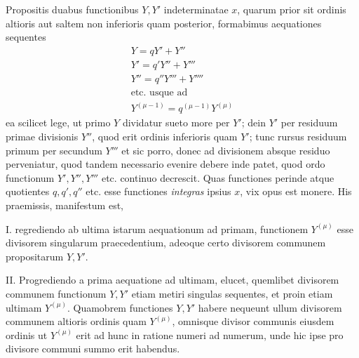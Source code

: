 Propositis duabus functionibus $Y,Y'$ indeterminatae $x$, quarum prior sit ordinis altioris aut saltem non inferioris quam posterior, formabimus aequationes sequentes
\[
\begin{gathered} Y=qY'+Y''\\ Y'=q'Y''+Y'''\\ Y''=q''Y'''+Y''''\\ \text{etc. usque ad}\\ Y^{(\mu-1)}=q^{(\mu-1)}Y^{(\mu)}
\end{gathered}
\] ea scilicet lege, ut primo $Y$ dividatur sueto more per $Y'$; dein $Y'$ per residuum primae divisionis $Y''$, quod erit ordinis inferioris quam $Y'$; tunc rursus residuum primum per secundum $Y'''$ et sic porro, donec ad divisionem absque residuo perveniatur, quod tandem necessario evenire debere inde patet, quod ordo functionum $Y',Y'',Y'''$ etc. continuo decrescit. Quas functiones perinde atque quotientes $q,q',q''$ etc. esse functiones \textit{integras} ipsius $x$, vix opus est monere. His praemissis, manifestum est,

I. regrediendo ab ultima istarum aequationum ad primam, functionem $Y^{(\mu)}$ esse divisorem singularum praecedentium, adeoque certo divisorem communem propositarum $Y,Y'$.

II. Progrediendo a prima aequatione ad ultimam, elucet, quemlibet divisorem communem functionum $Y,Y'$ etiam metiri singulas sequentes, et proin etiam ultimam $Y^{(\mu)}$. Quamobrem functiones $Y,Y'$ habere nequeunt ullum divisorem communem altioris ordinis quam $Y^{(\mu)}$, omnisque divisor communis eiusdem ordinis ut $Y^{(\mu)}$ erit ad hunc in ratione numeri ad numerum, unde hic ipse pro divisore communi summo erit habendus.
